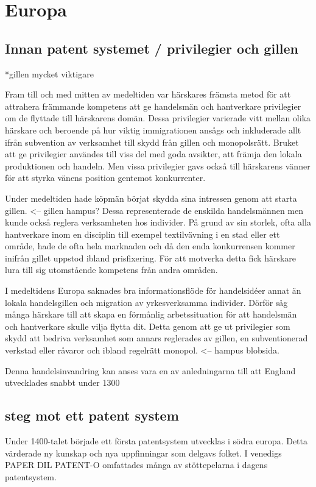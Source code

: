 \section{Europa}

\subsection{Innan patent systemet / privilegier och gillen} %
\label{sub:innan_patent_systemet}
*gillen mycket viktigare

Fram till och med mitten av medeltiden var härskares främsta metod för att attrahera främmande kompetens att ge handelsmän och hantverkare privilegier om de flyttade till härskarens domän. 
Dessa privilegier varierade vitt mellan olika härskare och beroende på hur viktig immigrationen ansågs och inkluderade allt ifrån subvention av verksamhet till skydd från gillen och monopolsrätt. 
Bruket att ge privilegier användes till viss del med goda avsikter, att främja den lokala produktionen och handeln\cite{nard}. Men vissa privilegier gavs också till härskarens vänner för att styrka vänens position gentemot konkurrenter.


Under medeltiden hade köpmän börjat skydda sina intressen genom att starta gillen. <-- gillen hampus?
Dessa representerade de enskilda handelsmännen men kunde också reglera verksamheten hos individer. 
På grund av sin storlek, ofta alla hantverkare inom en disciplin till exempel textilvävning i en stad eller ett område, hade de ofta hela marknaden och då den enda konkurrensen kommer inifrån gillet uppstod ibland prisfixering. 
För att motverka detta fick härskare lura till sig utomstående kompetens från andra områden.

I medeltidens Europa saknades bra informationsflöde för handelsidéer annat än lokala handelsgillen och migration av yrkesverksamma individer. 
Dörför såg många härskare till att skapa en förmånlig arbetssituation för att handelsmän och hantverkare skulle vilja flytta dit. 
Detta genom att ge ut privilegier som skydd att bedriva verksamhet som annars reglerades av gillen, en subventionerad verkstad eller råvaror och ibland regelrätt monopol. <-- hampus blobsida. 

Denna handelsinvandring kan anses vara en av anledningarna till att England utvecklades snabbt under 1300


\subsection{steg mot ett patent system} %
\label{sub:steg_mot_ett_patent_system}
Under 1400-talet började ett första patentsystem utvecklas i södra europa. 
Detta värderade ny kunskap och nya uppfinningar som delgavs folket. 
I venedigs PAPER DIL PATENT-O omfattades många av stöttepelarna i dagens patentsystem. 


